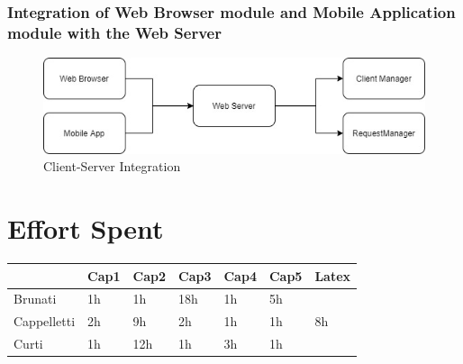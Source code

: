 \documentclass{article}
\begin{document}
    \newpage
    
    \subsubsection{Integration of Web Browser module and Mobile Application module with the Web Server}
        \begin{figure} [h]
            \centering
            \includegraphics[width=1\textwidth]{images/ImplementationAndTesting/ClientServerIntegration.jpg}
            \caption{\label{fig:ClientServerIntegration}Client-Server Integration}
        \end{figure}



\newpage


\section{Effort Spent}

    \begin{longtable}{|p{3cm}|p{}|p{}|p{}|p{}|p{}|p{}|}
        \hline
                        & Cap1  & Cap2  & Cap3  & Cap4  & Cap5  & Latex \\
        \hline
            Brunati     & 1h    & 1h    & 18h   & 1h    & 5h    &       \\
        \hline
            Cappelletti & 2h    & 9h    & 2h    & 1h    & 1h    & 8h      \\
        \hline 
            Curti       & 1h    & 12h   & 1h    & 3h    & 1h    &       \\
        \hline    
    \end{longtable}
\end{document}
